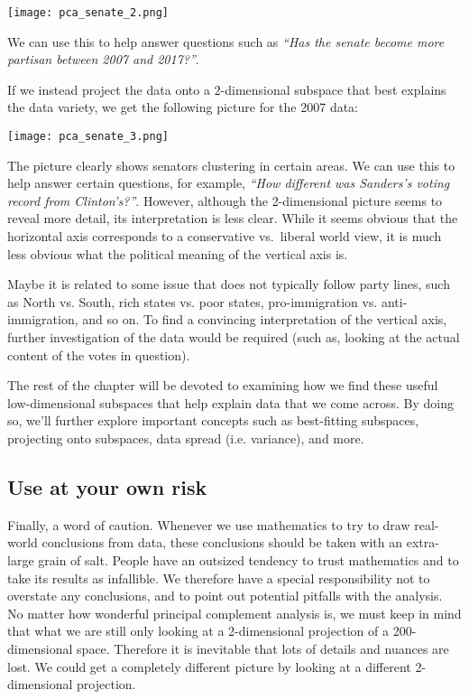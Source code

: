 \documentclass{ximera}
\begin{document}
\begin{center}
  \texttt{[image: pca\_senate\_2.png]}
\end{center}

We can use this to help answer questions such as {\em ``Has the senate
  become more partisan between 2007 and 2017?''}.

If we instead project the data onto a $2$-dimensional subspace that best explains the data variety, we get the following picture for the 2007 data:

\begin{center}
  \texttt{[image: pca\_senate\_3.png]}
\end{center}

The picture clearly shows senators clustering in certain areas. We can
use this to help answer certain questions, for example, {\em ``How
  different was Sanders's voting record from Clinton's?''}. However,
although the 2-dimensional picture seems to reveal more detail, its
interpretation is less clear. While it seems obvious that the
horizontal axis corresponds to a conservative vs.\ liberal world view,
it is much less obvious what the political meaning of the vertical
axis is. 

Maybe it is related to some issue that does not typically
follow party lines, such as North vs. South, rich states vs. poor
states, pro-immigration vs. anti-immigration, and so on.  To find a
convincing interpretation of the vertical axis, further investigation
of the data would be required (such as, looking at the actual content
of the votes in question).

The rest of the chapter will be devoted to examining how we find these useful low-dimensional subspaces that help explain data that we come across. By doing so, we'll further explore important concepts such as best-fitting subspaces, projecting onto subspaces, data spread (i.e. variance), and more.

\subsection*{Use at your own risk}
Finally, a word of caution. Whenever we use mathematics to try to draw
real-world conclusions from data, these conclusions should be taken
with an extra-large grain of salt. People have an outsized tendency to
trust mathematics and to take its results as infallible. We therefore
have a special responsibility not to overstate any conclusions, and to
point out potential pitfalls with the analysis. No matter how
wonderful principal complement analysis is, we must keep in mind that
what we are still only looking at a 2-dimensional projection of a
200-dimensional space. Therefore it is inevitable that lots of details
and nuances are lost. We could get a completely different picture by
looking at a different 2-dimensional projection.
\end{document}
